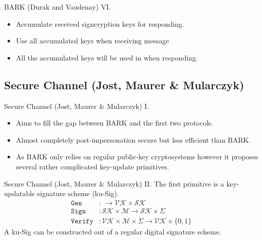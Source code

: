\documentclass{beamer}
\begin{document}
\begin{frame}{BARK (Durak and Vaudenay) VI.}
  \scriptsize
  \begin{figure}[ht]
     \centering
     \setlength{\fboxsep}{10pt}
     \scalebox{0.5}{%
       \fbox{%
         
       }
     }
  \end{figure}
  \begin{itemize}
  \item Accumulate received signcryption keys for responding.
  \item Use all accumulated keys when receiving message
  \item All the accumulated keys will be used in when responding.
  \end{itemize}
\end{frame}

\subsection{Secure Channel (Jost, Maurer \& Mularczyk)}
\label{sec:secure-channel-jost}

\begin{frame}{Secure Channel (Jost, Maurer \& Mularczyk) I.}
  \begin{itemize}
  \item Aims to fill the gap between BARK and the first two protocols.
  \item Almost completely post-impersonation secure but less efficient than BARK.
  \item As BARK only relies on regular public-key cryptosystems however
    it proposes several rather complicated key-update primitives.
  \end{itemize}
\end{frame}

\begin{frame}{Secure Channel (Jost, Maurer \& Mularczyk) II.}
  The first primitive is a key-updatable signature scheme (ku-Sig).
  \begin{align*}
    \texttt{Gen} & : \ \rightarrow \mathcal{VK} \times \mathcal{SK} \\
    \texttt{Sign} & : \mathcal{SK} \times \mathcal{M} \rightarrow \mathcal{SK} \times \Sigma \\
    \texttt{Verify} & : \mathcal{VK} \times \mathcal{M} \times \Sigma
             \rightarrow \mathcal{VK} \times \{0,1\}
  \end{align*}
A ku-Sig can be constructed out of a regular digital signature scheme.
\end{frame}
\end{document}
